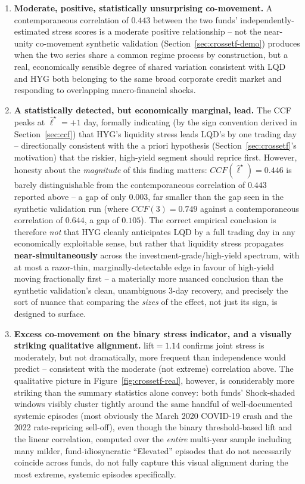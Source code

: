 \documentclass[11pt]{article}
\theoremstyle{definition}
\theoremstyle{remark}
\begin{document}
\begin{enumerate}
    \item \textbf{Moderate, positive, statistically unsurprising co-movement.} A contemporaneous correlation of $0.443$ between the two funds' independently-estimated stress scores is a moderate positive relationship -- not the near-unity co-movement synthetic validation (Section~\ref{sec:crossetf-demo}) produces when the two series share a common regime process by construction, but a real, economically sensible degree of shared variation consistent with LQD and HYG both belonging to the same broad corporate credit market and responding to overlapping macro-financial shocks.
    \item \textbf{A statistically detected, but economically marginal, lead.} The CCF peaks at $\widehat\ell^\star=+1$ day, formally indicating (by the sign convention derived in Section~\ref{sec:ccf}) that HYG's liquidity stress leads LQD's by one trading day -- directionally consistent with the a priori hypothesis (Section~\ref{sec:crossetf}'s motivation) that the riskier, high-yield segment should reprice first. However, honesty about the \emph{magnitude} of this finding matters: $CCF(\widehat\ell^\star)=0.446$ is barely distinguishable from the contemporaneous correlation of $0.443$ reported above -- a gap of only $0.003$, far smaller than the gap seen in the synthetic validation run (where $CCF(3)=0.749$ against a contemporaneous correlation of $0.644$, a gap of $0.105$). The correct empirical conclusion is therefore \emph{not} that HYG cleanly anticipates LQD by a full trading day in any economically exploitable sense, but rather that liquidity stress propagates \textbf{near-simultaneously} across the investment-grade/high-yield spectrum, with at most a razor-thin, marginally-detectable edge in favour of high-yield moving fractionally first -- a materially more nuanced conclusion than the synthetic validation's clean, unambiguous 3-day recovery, and precisely the sort of nuance that comparing the \emph{sizes} of the effect, not just its sign, is designed to surface.
    \item \textbf{Excess co-movement on the binary stress indicator, and a visually striking qualitative alignment.} $\mathrm{lift}=1.14$ confirms joint stress is moderately, but not dramatically, more frequent than independence would predict -- consistent with the moderate (not extreme) correlation above. The qualitative picture in Figure~\ref{fig:crossetf-real}, however, is considerably more striking than the summary statistics alone convey: both funds' Shock-shaded windows visibly cluster tightly around the same handful of well-documented systemic episodes (most obviously the March 2020 COVID-19 crash and the 2022 rate-repricing sell-off), even though the binary threshold-based lift and the linear correlation, computed over the \emph{entire} multi-year sample including many milder, fund-idiosyncratic ``Elevated'' episodes that do not necessarily coincide across funds, do not fully capture this visual alignment during the most extreme, systemic episodes specifically.
\end{enumerate}
\end{document}
